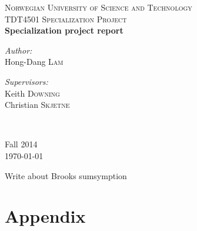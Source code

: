 \documentclass[12pt, a4paper]{article}
\begin{document}
\begin{titlepage}



\textsc{\LARGE Norwegian University of Science and Technology}\\[1.5cm]

\textsc{\Large TDT4501 Specialization Project}\\[0.5cm]


{ \huge \bfseries Specialization project report \\[0.4cm] }


\noindent
\begin{minipage}{0.4\textwidth}
\begin{flushleft} \large
\emph{Author:}\\
Hong-Dang \textsc{Lam}
\end{flushleft}
\end{minipage}%
\begin{minipage}{0.4\textwidth}
\begin{flushright} \large
\emph{Supervisors:} \\
Keith \textsc{Downing}\\
Christian \textsc{Skjetne}
\end{flushright}
\end{minipage}\\

\vfill

{Fall 2014\\\large \today}

\end{titlepage}




\newpage
\begin{abstract}

\end{abstract}

\newpage
\tableofcontents
\newpage
\listoffigures
\newpage
\listoftables
\newpage
{}


Write about Brooks sumsymption









\nocite{*}


\newpage
\section{Appendix}
\label{sec:app}
\appendix

	
	
\end{document}
